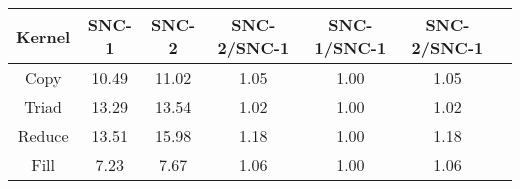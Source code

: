 \begin{tabular}{|c|c|c|c|c|c|c|}  \hline
Kernel&SNC-1&SNC-2 & SNC-2/SNC-1 & SNC-1/SNC-1 & SNC-2/SNC-1 \\ \hline 
Copy & 10.49 & 11.02  & 1.05 & 1.00 & 1.05 \\ \hline 
Triad & 13.29 & 13.54  & 1.02 & 1.00 & 1.02 \\ \hline 
Reduce & 13.51 & 15.98  & 1.18 & 1.00 & 1.18 \\ \hline 
Fill & 7.23 & 7.67  & 1.06 & 1.00 & 1.06 \\ \hline 
\end{tabular}
